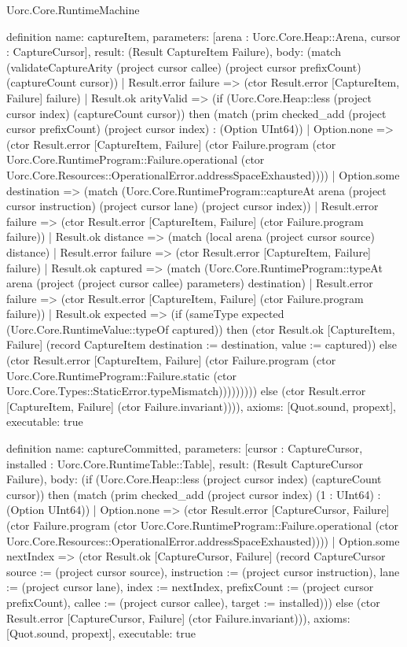 \begin{lexlean}{Uorc.Core.RuntimeMachine}
\begin{semanticmodule}
definition{
  name: captureItem,
  parameters: [arena : Uorc.Core.Heap::Arena, cursor : CaptureCursor],
  result: (Result CaptureItem Failure),
  body: (match (validateCaptureArity (project cursor callee) (project cursor prefixCount) (captureCount cursor))
    | Result.error failure => (ctor Result.error [CaptureItem, Failure] failure)
    | Result.ok arityValid => (if (Uorc.Core.Heap::less (project cursor index) (captureCount cursor)) then (match (prim checked_add (project cursor prefixCount) (project cursor index) : (Option UInt64))
      | Option.none => (ctor Result.error [CaptureItem, Failure] (ctor Failure.program (ctor Uorc.Core.RuntimeProgram::Failure.operational (ctor Uorc.Core.Resources::OperationalError.addressSpaceExhausted))))
      | Option.some destination => (match (Uorc.Core.RuntimeProgram::captureAt arena (project cursor instruction) (project cursor lane) (project cursor index))
        | Result.error failure => (ctor Result.error [CaptureItem, Failure] (ctor Failure.program failure))
        | Result.ok distance => (match (local arena (project cursor source) distance)
          | Result.error failure => (ctor Result.error [CaptureItem, Failure] failure)
          | Result.ok captured => (match (Uorc.Core.RuntimeProgram::typeAt arena (project (project cursor callee) parameters) destination)
            | Result.error failure => (ctor Result.error [CaptureItem, Failure] (ctor Failure.program failure))
            | Result.ok expected => (if (sameType expected (Uorc.Core.RuntimeValue::typeOf captured)) then (ctor Result.ok [CaptureItem, Failure] (record CaptureItem {destination := destination, value := captured})) else (ctor Result.error [CaptureItem, Failure] (ctor Failure.program (ctor Uorc.Core.RuntimeProgram::Failure.static (ctor Uorc.Core.Types::StaticError.typeMismatch))))))))) else (ctor Result.error [CaptureItem, Failure] (ctor Failure.invariant)))),
  axioms: [Quot.sound, propext],
  executable: true
}

definition{
  name: captureCommitted,
  parameters: [cursor : CaptureCursor, installed : Uorc.Core.RuntimeTable::Table],
  result: (Result CaptureCursor Failure),
  body: (if (Uorc.Core.Heap::less (project cursor index) (captureCount cursor)) then (match (prim checked_add (project cursor index) (1 : UInt64) : (Option UInt64))
    | Option.none => (ctor Result.error [CaptureCursor, Failure] (ctor Failure.program (ctor Uorc.Core.RuntimeProgram::Failure.operational (ctor Uorc.Core.Resources::OperationalError.addressSpaceExhausted))))
    | Option.some nextIndex => (ctor Result.ok [CaptureCursor, Failure] (record CaptureCursor {source := (project cursor source), instruction := (project cursor instruction), lane := (project cursor lane), index := nextIndex, prefixCount := (project cursor prefixCount), callee := (project cursor callee), target := installed}))) else (ctor Result.error [CaptureCursor, Failure] (ctor Failure.invariant))),
  axioms: [Quot.sound, propext],
  executable: true
}


\end{semanticmodule}
\end{lexlean}
